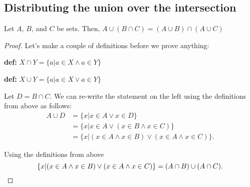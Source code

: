\subsection{Distributing the union over the intersection}
\label{sub_sec:distributing_the_union_over_the_intersection}

\begin{theorem}
  Let $A$, $B$, and $C$ be sets. Then, $A \cup (B \cap C) = (A \cup B) \cap (A \cup C)$
\end{theorem}
\begin{proof}
  Let's make a couple of definitions before we prove anything:

  \textbf{def:} $X \cap Y = \{ a \vert a \in X \land a \in Y \}$

  \textbf{def:} $X \cup Y = \{ a \vert a \in X \lor a \in Y \}$

  Let $D = B \cap C$. We can re-write the statement on the left using the
  definitions from above as follows:
  \begin{align*}
    A \cup D &= \{ x \vert x \in A \lor x \in D \} \\
             &= \{ x \vert x \in A \lor (x \in B \land x \in C) \} \\
             &= \{ x \vert (x \in A \land x \in B) \lor (x \in A \land x \in C) \}
  .\end{align*}

  Using the definitions from above
  \[%
    \{ x \vert (x \in A \land x \in B) \lor (x \in A \land x \in C) \} = (A \cap B) \cup (A \cap C)
  .\qedhere\]%
\end{proof}

